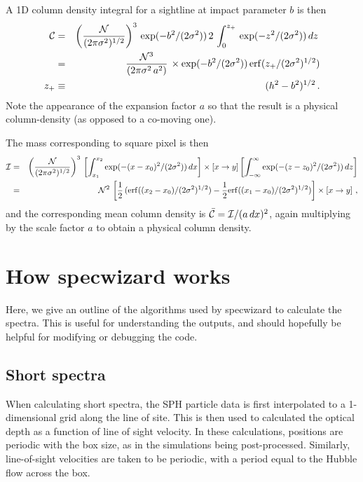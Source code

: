 \documentclass{report}
\begin{document}
A 1D column density integral for a sightline at impact parameter $b$ is then
\begin{eqnarray}
{\cal C} &=& \left({{\cal N}\over (2\pi \sigma^2)^{1/2}}\right)^3\,\exp(-b^2/(2\sigma^2))\,2\,\int_0^{z_+}\,\exp(-z^2/(2\sigma^2))\,dz\,\nonumber\\
&=& {{\cal N}^3\over (2\pi\sigma^2\,a^2)}\,\times \exp(-b^2/(2\sigma^2))\,{\rm erf}(z_+/(2\sigma^2)^{1/2})\nonumber\\
z_+ &\equiv & (h^2-b^2)^{1/2}\,.
\end{eqnarray}
Note the appearance of the expansion factor $a$ so that the result is a physical column-density (as opposed to a co-moving one).


The mass corresponding to square pixel is then
\begin{eqnarray}
{\cal I} &=& \left({{\cal N}\over (2\pi\sigma^2)^{1/2}}\right)^3\,\left[\int_{x_1}^{x_2}\exp(-(x-x_0)^2/(2\sigma^2))\,dx\right]\times\left[x\rightarrow y\right]\left[\int_{-\infty}^\infty \exp(-(z-z_0)^2/(2\sigma^2))\,dz\right]\nonumber\\
&=&{\cal N}^2\,\left[{1\over 2}\,({\rm erf}((x_2-x_0)/(2\sigma^2)^{1/2})-{1\over 2}{\rm erf}((x_1-x_0)/(2\sigma^2)^{1/2})\right]\times\left[x\rightarrow y\right]\,,
\end{eqnarray}
and the corresponding mean column density is $\bar{\cal C}={\cal I}/(a\,dx)^2$, again multiplying by the scale factor $a$ to obtain a physical column density.



\chapter{How specwizard works}
Here, we give an outline of the algorithms used by specwizard to calculate the spectra. This is useful for understanding the outputs, and should hopefully be helpful for modifying or debugging the code.

\section{Short spectra}
When calculating short spectra, the SPH particle data is first interpolated to a 1-dimensional grid along the line of site. This is then used to calculated the optical depth as a function of line of sight velocity. In these calculations, positions are periodic with the box size, as in the simulations being post-processed. Similarly, line-of-sight velocities are taken to be periodic, with a period equal to the Hubble flow across the box.
\end{document}
